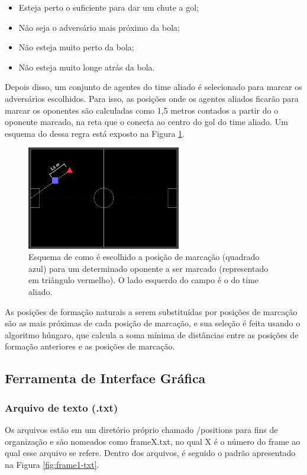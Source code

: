 \documentclass[a4paper,12pt]{article}
\begin{document}
\begin{itemize}
\item Esteja perto o suficiente para dar um chute a gol;
\item Não seja o adversário mais próximo da bola;
\item Não esteja muito perto da bola;
\item Não esteja muito longe atrás da bola.
\end{itemize}

Depois disso, um conjunto de agentes do time aliado é selecionado para marcar os adversários escolhidos. Para isso, as posições onde os agentes aliados ficarão para marcar os oponentes são calculadas como 1,5 metros contados a partir do o oponente marcado, na reta que o conecta ao centro do gol do time aliado. Um esquema do dessa regra está exposto na Figura \ref{fig:marking-position}.

\begin{figure}[H]
	\centering
	\includegraphics[width=0.6\textwidth]{figures/marking-position.png}
   \caption{Esquema de como é escolhido a posição de marcação (quadrado azul) para um determinado oponente a ser marcado (representado em triângulo vermelho). O lado esquerdo do campo é o do time aliado.} \label{fig:marking-position}
\end{figure}

As posições de formação naturais a serem substituídas por posições de marcação são as mais próximas de cada posição de marcação, e sua seleção é feita usando o algoritmo húngaro, que calcula a soma mínima de distâncias entre as posições de formação anteriores e as posições de marcação.

\subsection{Ferramenta de Interface Gráfica}
\subsubsection{Arquivo de texto (.txt)}
Os arquivos estão em um diretório próprio chamado /positions para fins de organização e são nomeados como frameX.txt, no qual X é o número do frame ao qual esse arquivo se refere. Dentro dos arquivos, é seguido o padrão apresentado na Figura \ref{fig:frame1-txt}.
\end{document}
